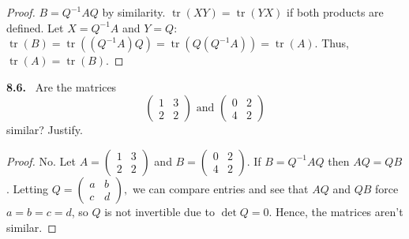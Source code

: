 \documentclass[12pt]{amsart}
\DeclareMathOperator{\tr}{tr}
\theoremstyle{plain}
\theoremstyle{definition}
\theoremstyle{remark}
\newenvironment{problem}[1]{\par\medskip\noindent\textbf{#1.}\ }{\par\smallskip}
\begin{document}
\begin{proof}
    $B = Q^{-1}AQ$ by similarity. $\tr(XY) = \tr(YX)$ if both products are defined. Let $X = Q^{-1}A$ and $Y = Q$: $\tr(B)=\tr((Q^{-1}A)Q) = \tr(Q(Q^{-1}A)) = \tr(A)$. Thus, $\tr (A) = \tr (B)$. 
\end{proof}

\begin{problem}{8.6}
    Are the matrices 
    \[\begin{pmatrix}
        1 & 3 \\ 2 & 2
    \end{pmatrix} \text{ and } \begin{pmatrix}
        0 & 2 \\ 4 & 2
    \end{pmatrix}\]
    similar? Justify.
\end{problem}

\begin{proof}
    No. Let $A = \begin{pmatrix}
        1 & 3 \\ 2 & 2
    \end{pmatrix}$ and $B = \begin{pmatrix}
        0 & 2 \\ 4 & 2
    \end{pmatrix}$. If $B = Q^{-1}AQ$ then $AQ = QB$. Letting $Q = \begin{pmatrix}
        a & b \\ c & d
    \end{pmatrix},$ we can compare entries and see that $AQ$ and $QB$ force $a=b=c=d$, so $Q$ is not invertible due to $\det Q = 0$. Hence, the matrices aren't similar. 
\end{proof}
\end{document}
